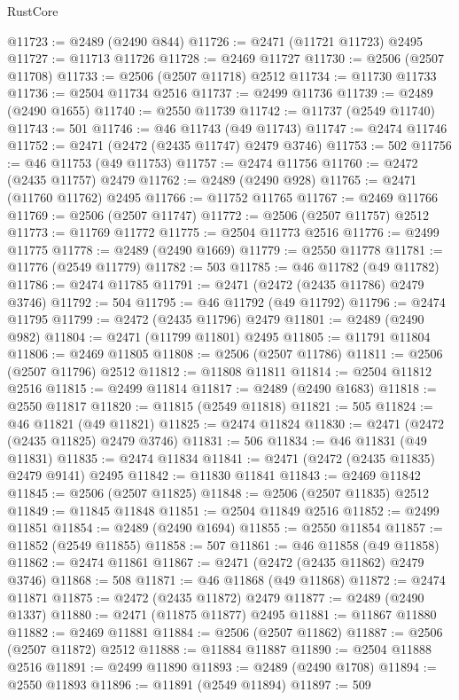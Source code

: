 \begin{lexlean}{RustCore}
\begin{coremodule}
@11723 := @2489 (@2490 @844)
@11726 := @2471 (@11721 @11723) @2495
@11727 := @11713 @11726
@11728 := @2469 @11727
@11730 := @2506 (@2507 @11708)
@11733 := @2506 (@2507 @11718) @2512
@11734 := @11730 @11733
@11736 := @2504 @11734 @2516
@11737 := @2499 @11736
@11739 := @2489 (@2490 @1655)
@11740 := @2550 @11739
@11742 := @11737 (@2549 @11740)
@11743 := 501
@11746 := @46 @11743 (@49 @11743)
@11747 := @2474 @11746
@11752 := @2471 (@2472 (@2435 @11747) @2479 @3746)
@11753 := 502
@11756 := @46 @11753 (@49 @11753)
@11757 := @2474 @11756
@11760 := @2472 (@2435 @11757) @2479
@11762 := @2489 (@2490 @928)
@11765 := @2471 (@11760 @11762) @2495
@11766 := @11752 @11765
@11767 := @2469 @11766
@11769 := @2506 (@2507 @11747)
@11772 := @2506 (@2507 @11757) @2512
@11773 := @11769 @11772
@11775 := @2504 @11773 @2516
@11776 := @2499 @11775
@11778 := @2489 (@2490 @1669)
@11779 := @2550 @11778
@11781 := @11776 (@2549 @11779)
@11782 := 503
@11785 := @46 @11782 (@49 @11782)
@11786 := @2474 @11785
@11791 := @2471 (@2472 (@2435 @11786) @2479 @3746)
@11792 := 504
@11795 := @46 @11792 (@49 @11792)
@11796 := @2474 @11795
@11799 := @2472 (@2435 @11796) @2479
@11801 := @2489 (@2490 @982)
@11804 := @2471 (@11799 @11801) @2495
@11805 := @11791 @11804
@11806 := @2469 @11805
@11808 := @2506 (@2507 @11786)
@11811 := @2506 (@2507 @11796) @2512
@11812 := @11808 @11811
@11814 := @2504 @11812 @2516
@11815 := @2499 @11814
@11817 := @2489 (@2490 @1683)
@11818 := @2550 @11817
@11820 := @11815 (@2549 @11818)
@11821 := 505
@11824 := @46 @11821 (@49 @11821)
@11825 := @2474 @11824
@11830 := @2471 (@2472 (@2435 @11825) @2479 @3746)
@11831 := 506
@11834 := @46 @11831 (@49 @11831)
@11835 := @2474 @11834
@11841 := @2471 (@2472 (@2435 @11835) @2479 @9141) @2495
@11842 := @11830 @11841
@11843 := @2469 @11842
@11845 := @2506 (@2507 @11825)
@11848 := @2506 (@2507 @11835) @2512
@11849 := @11845 @11848
@11851 := @2504 @11849 @2516
@11852 := @2499 @11851
@11854 := @2489 (@2490 @1694)
@11855 := @2550 @11854
@11857 := @11852 (@2549 @11855)
@11858 := 507
@11861 := @46 @11858 (@49 @11858)
@11862 := @2474 @11861
@11867 := @2471 (@2472 (@2435 @11862) @2479 @3746)
@11868 := 508
@11871 := @46 @11868 (@49 @11868)
@11872 := @2474 @11871
@11875 := @2472 (@2435 @11872) @2479
@11877 := @2489 (@2490 @1337)
@11880 := @2471 (@11875 @11877) @2495
@11881 := @11867 @11880
@11882 := @2469 @11881
@11884 := @2506 (@2507 @11862)
@11887 := @2506 (@2507 @11872) @2512
@11888 := @11884 @11887
@11890 := @2504 @11888 @2516
@11891 := @2499 @11890
@11893 := @2489 (@2490 @1708)
@11894 := @2550 @11893
@11896 := @11891 (@2549 @11894)
@11897 := 509

\end{coremodule}
\end{lexlean}
